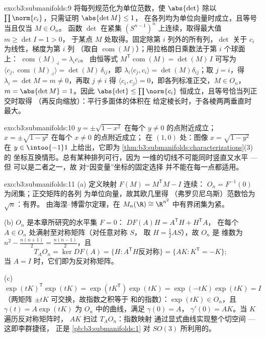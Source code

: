 \begin{solution}{exo:b3:submanifolds:9}
将每列规范化为单位范数，使 $\abs{\det}$ 除以
$\prod\norm{c_i}$，只需证明 $\abs{\det M} \leq 1$，
在各列均为单位向量时成立，且等号当且仅当 $M \in O_n$。
函数 $\det$ 在紧集
$(S^{n-1})^n$ 上连续，取得最大值 $m \geq \det I = 1 > 0$，
于某点 $M$ 处取得。固定除第 $i$ 列外的所有列，$\det$ 关于
$c_i$ 为线性，梯度为第 $i$ 列
（取自 $\operatorname{com}(M)$）；用拉格朗日乘数法于第 $i$ 个球面上：
$\operatorname{com}(M)_{\cdot i} = \lambda_i c_i$。
由恒等式 $M^{\mathsf T}\operatorname{com}(M) = \det(M)\,I$
可写为 $\langle c_j, \operatorname{com}(M)_{\cdot i}\rangle =
\det(M)\,\delta_{ij}$，即 $\lambda_i\langle c_j,
c_i\rangle = \det(M)\delta_{ij}$；取 $j = i$，得 $\lambda_i
= \det M = m \neq 0$，再取 $j \neq i$ 得 $\langle c_i,
c_j\rangle = 0$，即各列标准正交，$M \in O_n$，
$m = \abs{\det M} = 1$。因此 $\abs{\det} \leq
\prod\norm{c_i}$ 恒成立，且等号恰当列正交时取得
（再反向缩放）：平行多面体的体积在
给定棱长时，于各棱两两垂直时最大。
\end{solution}

\begin{solution}{exo:b3:submanifolds:10}
$y = \pm\sqrt{1 - x^2}$ 在每个 $y \neq
0$ 的点附近成立；$x = \pm\sqrt{1 - y^2}$ 在每个 $x \neq 0$ 的点附近成立；
在 $(1, 0)$ 处：图像 $x = \sqrt{1 - y^2}$ 在 $y \in
\intoo{-1}1$ 上给出，它即为
\cref{thm:b3:submanifolds:characterizations}(3) 的
坐标互换情形。总有某种排列可行，因为
一维的切线不可能同时竖直又水平 --- 但
可以是二者之一，故
对“因变量”坐标的固定选择
并不能在每一点都适用。
\end{solution}

\begin{solution}{exo:b3:submanifolds:11}
(a) 定义映射 $F(M) = M^{\mathsf T}M - I$ 连续：
$O_n = F^{-1}(0)$ 为闭集；正交矩阵的各列
为单位向量，故其欧几里得
（弗罗贝尼乌斯）范数恰为 $\sqrt n$：有界。
由海涅–博雷尔定理，在 $M_n(\R) \cong \R^{n^2}$ 中有界闭集为紧。

(b) $O_n$ 是本章所研究的水平集 $F = 0$：
$DF(A)H = A^{\mathsf T}H + H^{\mathsf T}A$，
在每个 $A \in O_n$ 处满射至对称矩阵（对任意对称 $S$，
取 $H = \frac12AS$），故 $O_n$ 是
维数为 $n^2 - \frac{n(n+1)}2 = \frac{n(n-1)}2$，且
\[
T_AO_n = \ker DF(A) = \{H : A^{\mathsf T}H \text{
反对称}\} = \{AK : K^{\mathsf T} = -K\} ;
\]
当 $A = I$ 时，它们即为反对称矩阵。

(c) $\exp(tK)^{\mathsf T}\exp(tK) = \exp(tK^{\mathsf T})
\exp(tK) = \exp(-tK)\exp(tK) = I$（两矩阵 $\pm tK$
可交换，故指数之积等于
和的指数）：$\exp(tK) \in O_n$，且 $\gamma(t) =
A\exp(tK)$ 为 $O_n$ 中的曲线，满足 $\gamma(0) = A$，
$\gamma'(0) = AK$。当 $K$ 遍历反对称矩阵时，
$AK$ 扫过 $T_AO_n$：指数映射
通过显式曲线实现整个切空间 --- 这即李群捷径，
正是 \cref{pb:b3:submanifolds:1} 对 $SO(3)$ 所利用的。
\end{solution}

